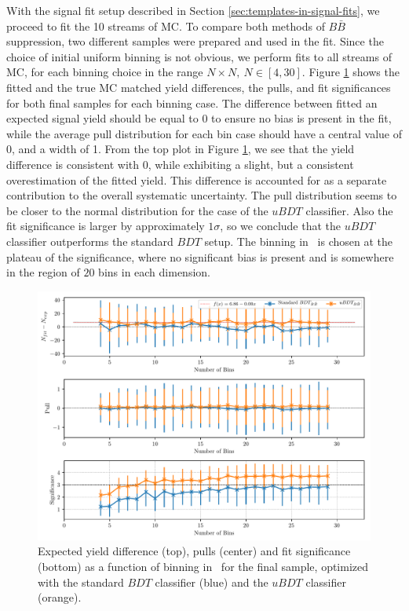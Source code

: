 With the signal fit setup described in Section \ref{sec:templates-in-signal-fits}, we proceed to fit the 10 streams of MC. To compare both methods of $B \bar B$ suppression, two different samples were prepared and used in the fit. Since the choice of initial uniform binning is not obvious, we perform fits to all streams of MC, for each binning choice in the range $N\times N,~N\in[4,30]$. Figure \ref{fig:sig_binning} shows the fitted and the true MC matched yield differences, the pulls, and fit significances for both final samples for each binning case. The difference between fitted an expected signal yield should be equal to 0 to ensure no bias is present in the fit, while the average pull distribution for each bin case should have a central value of 0, and a width of 1. From the top plot in Figure \ref{fig:sig_binning}, we see that the yield difference is consistent with 0, while exhibiting a slight, but a consistent overestimation of the fitted yield. This difference is accounted for as a separate contribution to the overall systematic uncertainty. The pull distribution seems to be closer to the normal distribution for the case of the $uBDT$ classifier. Also the fit significance is larger by approximately $1\sigma$, so we conclude that the $uBDT$ classifier outperforms the standard $BDT$ setup. The binning in \vars~is chosen at the plateau of the significance, where no significant bias is present and is somewhere in the region of $20$ bins in each dimension.

\begin{figure}[H]
	\centering
	\captionsetup{width=0.8\linewidth}
	\includegraphics[width=\linewidth]{fig/sig_binning}
	\caption{Expected yield difference (top), pulls (center) and fit significance (bottom) as a function of binning in \vars~for the final sample, optimized with the standard $BDT$ classifier (blue) and the $uBDT$ classifier (orange).}
	\label{fig:sig_binning}
\end{figure}

